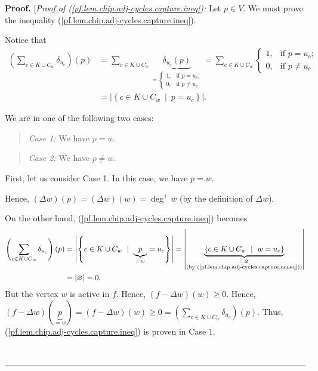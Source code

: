 \documentclass[numbers=enddot,12pt,final,onecolumn,notitlepage]{scrartcl}%
\theoremstyle{definition}
\newenvironment{statement}{\begin{quote}}{\end{quote}}
\newenvironment{proof}[1][Proof]{\noindent\textbf{#1.} }{\ \rule{0.5em}{0.5em}}
\let\sumnonlimits\sum
\renewcommand{\sum}{\sumnonlimits\limits}
\newenvironment{noncompile}{}{}
\begin{document}
\begin{proof}
[\textit{Proof of (\ref{pf.lem.chip.adj-cycles.capture.ineq}):} Let $p\in V$.
We must prove the inequality (\ref{pf.lem.chip.adj-cycles.capture.ineq}).

Notice that%
\begin{align}
\left(  \sum_{c\in K\cup C_{w}}\delta_{u_{c}}\right)  \left(  p\right)    &
=\sum_{c\in K\cup C_{w}}\underbrace{\delta_{u_{c}}\left(  p\right)  }_{=%
\begin{cases}
1, & \text{if }p=u_{c};\\
0, & \text{if }p\neq u_{c}%
\end{cases}
}=\sum_{c\in K\cup C_{w}}%
\begin{cases}
1, & \text{if }p=u_{c};\\
0, & \text{if }p\neq u_{c}%
\end{cases}
\nonumber\\
& =\left\vert \left\{  c\in K\cup C_{w}\ \mid\ p=u_{c}\right\}  \right\vert
.\label{pf.lem.chip.adj-cycles.capture.ineq.rhs}%
\end{align}


We are in one of the following two cases:

\begin{statement}
\textit{Case 1:} We have $p=w$.
\end{statement}

\begin{statement}
\textit{Case 2:} We have $p\neq w$.
\end{statement}

First, let us consider Case 1. In this case, we have $p=w$.

\begin{noncompile}
Hence, $\left(  \Delta w\right)  \left(  p\right)  =\left(  \Delta w\right)
\left(  w\right)  =\deg^{+}w$ (by the definition of $\Delta w$).
\end{noncompile}

On the other hand, (\ref{pf.lem.chip.adj-cycles.capture.ineq}) becomes%
\begin{align*}
\left(  \sum_{c\in K\cup C_{w}}\delta_{u_{c}}\right)  \left(  p\right)    &
=\left\vert \left\{  c\in K\cup C_{w}\ \mid\ \underbrace{p}_{=w}%
=u_{c}\right\}  \right\vert =\left\vert \underbrace{\left\{  c\in K\cup
C_{w}\ \mid\ w=u_{c}\right\}  }_{\substack{=\varnothing\\\text{(by
(\ref{pf.lem.chip.adj-cycles.capture.ucneq}))}}}\right\vert \\
& =\left\vert \varnothing\right\vert =0.
\end{align*}
But the vertex $w$ is active in $f$. Hence, $\left(  f-\Delta w\right)
\left(  w\right)  \geq0$. Hence, $\left(  f-\Delta w\right)  \left(
\underbrace{p}_{=w}\right)  =\left(  f-\Delta w\right)  \left(  w\right)
\geq0=\left(  \sum_{c\in K\cup C_{w}}\delta_{u_{c}}\right)  \left(  p\right)
$. Thus, (\ref{pf.lem.chip.adj-cycles.capture.ineq}) is proven in Case 1.


\end{proof}
\end{document}
